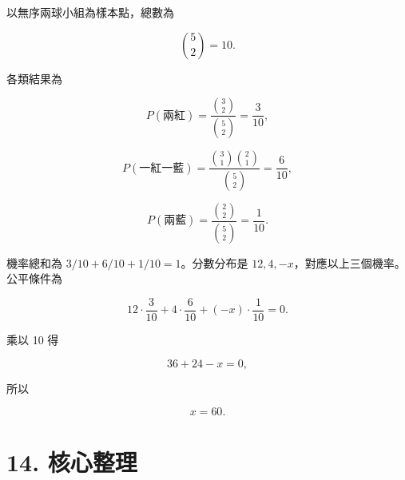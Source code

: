 \documentclass[11pt,a4paper]{article}
\begin{document}
以無序兩球小組為樣本點，總數為

\[
\binom52=10.
\]

各類結果為

\[
P(\text{兩紅})=\frac{\binom32}{\binom52}=\frac3{10},
\]

\[
P(\text{一紅一藍})=\frac{\binom31\binom21}{\binom52}=\frac6{10},
\]

\[
P(\text{兩藍})=\frac{\binom22}{\binom52}=\frac1{10}.
\]

機率總和為 \(3/10+6/10+1/10=1\)。分數分布是 \(12,4,-x\)，對應以上三個機率。公平條件為

\[
12\cdot\frac3{10}+4\cdot\frac6{10}+(-x)\cdot\frac1{10}=0.
\]

乘以 10 得

\[
36+24-x=0,
\]

所以

\[
\boxed{x=60}.
\]

\section{14. 核心整理}\label{ux6838ux5fc3ux6574ux7406}
\end{document}
